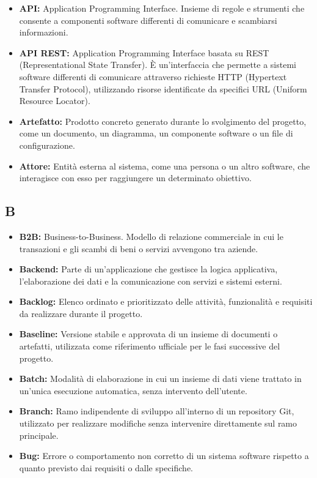 \begin{itemize}
    \item \textbf{API:} Application Programming Interface. Insieme di regole e strumenti che consente a componenti software differenti di comunicare e scambiarsi informazioni.
    \item \textbf{API REST:} Application Programming Interface basata su REST (Representational State Transfer). È un'interfaccia che permette a sistemi software differenti di comunicare attraverso richieste HTTP (Hypertext Transfer Protocol), utilizzando risorse identificate da specifici URL (Uniform Resource Locator).
    \item \textbf{Artefatto:} Prodotto concreto generato durante lo svolgimento del progetto, come un documento, un diagramma, un componente software o un file di configurazione.
    \item \textbf{Attore:} Entità esterna al sistema, come una persona o un altro software, che interagisce con esso per raggiungere un determinato obiettivo.
\end{itemize}


{}
\subsection*{B}

\begin{itemize}
    \item \textbf{B2B:} Business-to-Business. Modello di relazione commerciale in cui le transazioni e gli scambi di beni o servizi avvengono tra aziende.
    \item \textbf{Backend:} Parte di un'applicazione che gestisce la logica applicativa, l'elaborazione dei dati e la comunicazione con servizi e sistemi esterni.
    \item \textbf{Backlog:} Elenco ordinato e prioritizzato delle attività, funzionalità e requisiti da realizzare durante il progetto.
    \item \textbf{Baseline:} Versione stabile e approvata di un insieme di documenti o artefatti, utilizzata come riferimento ufficiale per le fasi successive del progetto.
    \item \textbf{Batch:} Modalità di elaborazione in cui un insieme di dati viene trattato in un'unica esecuzione automatica, senza intervento dell'utente.
    \item \textbf{Branch:} Ramo indipendente di sviluppo all'interno di un repository Git, utilizzato per realizzare modifiche senza intervenire direttamente sul ramo principale.
    \item \textbf{Bug:} Errore o comportamento non corretto di un sistema software rispetto a quanto previsto dai requisiti o dalle specifiche.
\end{itemize}

